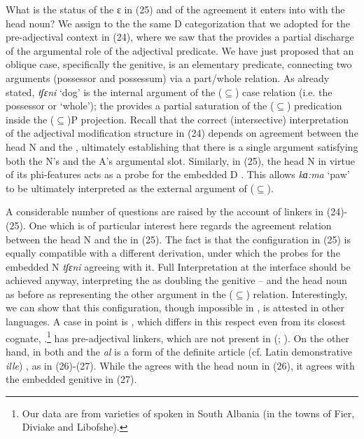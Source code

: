 \documentclass[output=paper]{langsci/langscibook}
\begin{document}
What is the status of the  ɛ in (25) and of the agreement it enters into with the head noun? We assign to the  the same D categorization that we adopted for the pre-ad\-jec\-ti\-val context in (24), where we saw that the  provides a partial discharge of the argumental role of the adjectival predicate. We have just proposed that an oblique case, specifically the genitive, is an elementary predicate, connecting two arguments (possessor and possessum) via a part\slash whole relation. As already stated, \textit{tʃɛni} ‘dog’ is the internal argument of the ($\subseteq$) case relation (i.e. the possessor or ‘whole’); the  provides a partial saturation of the ($\subseteq$) predication inside the ($\subseteq$)P projection. Recall that the correct (intersective) interpretation of the adjectival modification structure in (24) depends on agreement between the head N and the , ultimately establishing that there is a single argument satisfying both the N’s and the A’s argumental slot. Similarly, in (25), the head N in virtue of its phi-features acts as a probe for the embedded D . This allows \textit{kɑ:ma} ‘paw’ to be ultimately interpreted as the external argument of ($\subseteq$).

A considerable number of questions are raised by the account of linkers in (24)-(25). One which is of particular interest here regards the agreement relation between the head N and the  in (25). The fact is that the configuration in (25) is equally compatible with a different derivation, under which the  probes for the embedded N \textit{tʃɛni} agreeing with it. Full Interpretation at the interface should be achieved anyway, interpreting the  as doubling the genitive – and the head noun as before as representing the other argument in the ($\subseteq$) relation. Interestingly, we can show that this configuration, though impossible in , is attested in other languages. A case in point is , which differs in this respect even from its closest cognate, .\footnote{Our data are from varieties of  spoken in South Albania (in the towns of Fier, Diviake and Libofshe).}  has pre-ad\-jec\-ti\-val linkers, which are not present in  (\citealt{Campos2008}; \citealt{Cornilescu2013}). On the other hand, in both  and  the  \textit{al} is a form of the definite article (cf. Latin demonstrative \textit{ille}) \citep{Giurgea2012}, as in (26)-(27). While the  agrees with the head noun in  (26), it agrees with the embedded genitive in  (27).
\end{document}
